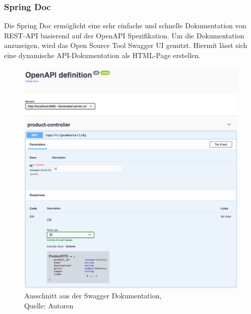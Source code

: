 \subsubsection{Spring Doc}
Die Spring Doc ermöglicht eine sehr einfache und schnelle Dokumentation von REST-API basierend auf der OpenAPI Spezifikation. Um die Dokumentation anzuzeigen, wird das Open Source Tool Swagger UI genutzt. Hiermit lässt sich eine dynamische API-Dokumentation als HTML-Page erstellen. 
\begin{figure}[H]
	\centering
	\includegraphics[scale=0.3]{images/swaggerui.png}
	\caption[Ausschnitt aus der Swagger Dokumentation]{Ausschnitt aus der Swagger Dokumentation,\\ Quelle: Autoren}
	\label{img: swaggerUI}
\end{figure}



\newpage
